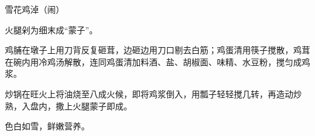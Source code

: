 \begin{recipe}{雪花鸡淖（闹）}

\ingredients



\cooking

\step 火腿剁为细末成“蒙子”。

\step 鸡脯在墩子上用刀背反复砸茸，边砸边用刀口剔去白筋；鸡蛋清用筷子搅散，鸡茸
在碗内用冷鸡汤解散，连同鸡蛋清加料酒、盐、胡椒面、味精、水豆粉，搅匀成鸡浆。

\step 炒锅在旺火上将油烧至八成火候，即将鸡浆倒入，用瓢子轻轻搅几转，再造动炒
熟，入盘内，撒上火腿蒙子即成。

\notes

色白如雪，鲜嫩营养。

\end{recipe}


